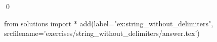 
\begin{ex} 
  \label{ex:string_without_delimiters}
  
  \qed
\end{ex} 
\begin{python0}
from solutions import *
add(label="ex:string_without_delimiters",
    srcfilename='exercises/string_without_delimiters/answer.tex') 
\end{python0}
